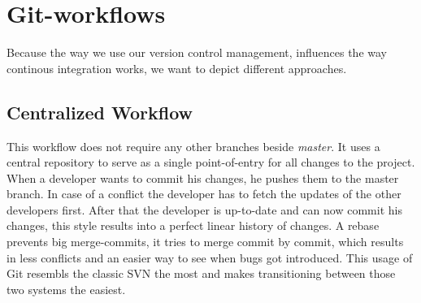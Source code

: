 \section{Git-workflows}\label{sec:Git-workflows}

Because the way we use our version control management, influences the way continous integration works, we want to depict different approaches.

\subsection{Centralized Workflow}\label{sec:Centralized Workflow}
This workflow does not require any other branches beside \textit{master}. It uses a central repository to serve as a single point-of-entry for all changes to the project.
When a developer wants to commit his changes, he pushes them to the master branch. In case of a conflict the developer has to fetch the updates of the other developers first.
After that the developer is up-to-date and can now commit his changes, this style results into a perfect linear history of changes.
A rebase prevents big merge-commits, it tries to merge commit by commit, which results in less conflicts and an easier way to see when bugs got introduced.
This usage of Git resembls the classic SVN the most and makes transitioning between those two systems the easiest. \\

